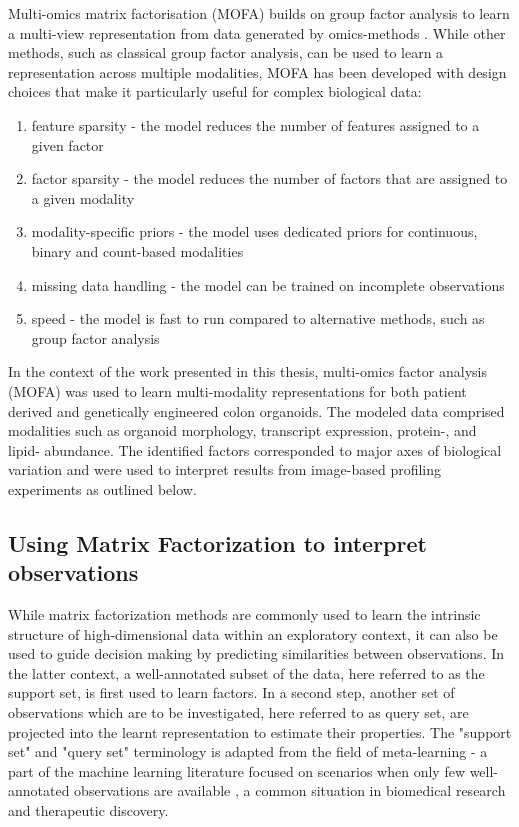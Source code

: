 \begin{flushleft}
Multi-omics matrix factorisation (MOFA) builds on group factor analysis to learn a multi-view representation from data generated by omics-methods \citep{argelaguetMultiOmicsFactorAnalysis2018b, argelaguetMOFAStatisticalFramework2020a}. While other methods, such as classical group factor analysis, can be used to learn a representation across multiple modalities, MOFA has been developed with design choices that make it particularly useful for complex biological data:

\begin{enumerate}
    \item feature sparsity - the model reduces the number of features assigned to a given factor
    \item factor sparsity - the model reduces the number of factors that are assigned to a given modality
    \item modality-specific priors - the model uses dedicated priors for continuous, binary and count-based modalities 
    \item missing data handling - the model can be trained on incomplete observations
    \item speed - the model is fast to run compared to alternative methods, such as group factor analysis
\end{enumerate}
 
\bigbreak
In the context of the work presented in this thesis, multi-omics factor analysis (MOFA) was used to learn multi-modality representations for both patient derived and genetically engineered colon organoids. The modeled data comprised modalities such as organoid morphology, transcript expression, protein-, and lipid- abundance. The identified factors corresponded to major axes of biological variation and were used to interpret results from image-based profiling experiments as outlined below. 

\subsection{Using Matrix Factorization to interpret observations}

While matrix factorization methods are commonly used to learn the intrinsic structure of high-dimensional data within an exploratory context, it can also be used to guide decision making by predicting similarities between observations. In the latter context, a well-annotated subset of the data, here referred to as the support set, is first used to learn factors. In a second step, another set of observations which are to be investigated, here referred to as query set, are projected into the learnt representation to estimate their properties. The "support set" and "query set" terminology is adapted from the field of meta-learning - a part of the machine learning literature focused on scenarios when only few well-annotated observations are available \citep{hospedalesMetaLearningNeuralNetworks2020}, a common situation in biomedical research and therapeutic discovery. 
\par


\end{flushleft}
